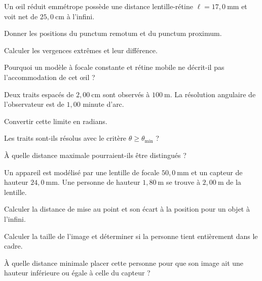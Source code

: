Un œil réduit emmétrope possède une distance lentille-rétine $\ell=17{,}0\ \mathrm{mm}$ et voit net de $25{,}0\ \mathrm{cm}$ à l'infini.
\begin{questions}
\item Donner les positions du punctum remotum et du punctum proximum.
\item Calculer les vergences extrêmes et leur différence.
\item Pourquoi un modèle à focale constante et rétine mobile ne décrit-il pas l'accommodation de cet œil ?
\end{questions}
Deux traits espacés de $2{,}00\ \mathrm{cm}$ sont observés à $100\ \mathrm{m}$. La résolution angulaire de l'observateur est de $1{,}00$ minute d'arc.
\begin{questions}
\item Convertir cette limite en radians.
\item Les traits sont-ils résolus avec le critère $\theta\geq\theta_{\min}$ ?
\item À quelle distance maximale pourraient-ils être distingués ?
\end{questions}
Un appareil est modélisé par une lentille de focale $50{,}0\ \mathrm{mm}$ et un capteur de hauteur $24{,}0\ \mathrm{mm}$. Une personne de hauteur $1{,}80\ \mathrm{m}$ se trouve à $2{,}00\ \mathrm{m}$ de la lentille.
\begin{questions}
\item Calculer la distance de mise au point et son écart à la position pour un objet à l'infini.
\item Calculer la taille de l'image et déterminer si la personne tient entièrement dans le cadre.
\item À quelle distance minimale placer cette personne pour que son image ait une hauteur inférieure ou égale à celle du capteur ?
\end{questions}

